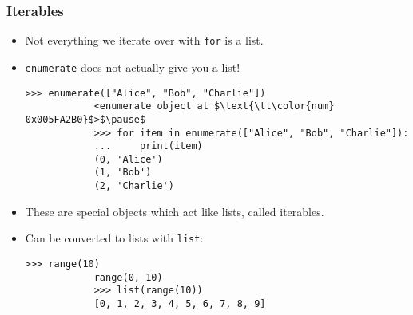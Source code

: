 \documentclass[presentation]{beamer}
\begin{document}
	\begin{frame}[fragile]
		\frametitle{Iterables}
		
		\begin{itemize}
			\item Not everything we iterate over with \lstinline|for| is a list.
			
			\pause
			
			\item \lstinline|enumerate| does not actually give you a list!
			\begin{lstlisting}[xleftmargin=\dimexpr-\leftmargini, basicstyle=\scriptsize\tt]
			>>> enumerate(["Alice", "Bob", "Charlie"])
			<enumerate object at $\text{\tt\color{num} 0x005FA2B0}$>$\pause$
			>>> for item in enumerate(["Alice", "Bob", "Charlie"]):
			...     print(item)
			(0, 'Alice')
			(1, 'Bob')
			(2, 'Charlie')
			\end{lstlisting}
			
			\pause
			
			\item These are special objects which act like lists, called \colorbox{jargonbg}{iterables}.
			
			\item Can be converted to lists with \lstinline|list|:
			\begin{lstlisting}[xleftmargin=\dimexpr-\leftmargini]
			>>> range(10)
			range(0, 10)
			>>> list(range(10))
			[0, 1, 2, 3, 4, 5, 6, 7, 8, 9]
			\end{lstlisting}
			
		\end{itemize}
	\end{frame}
	
\end{document}
